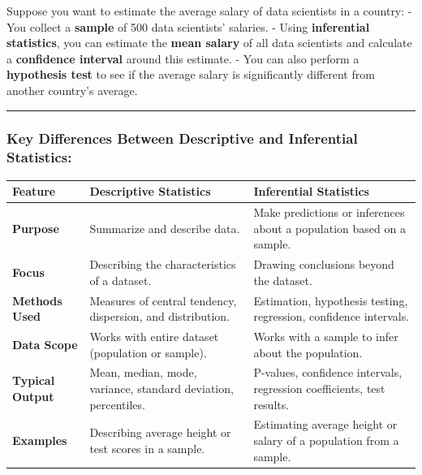 \documentclass[12pt]{book}
\begin{document}
Suppose you want to estimate the average salary of data scientists in a
country: - You collect a \textbf{sample} of 500 data scientists'
salaries. - Using \textbf{inferential statistics}, you can estimate the
\textbf{mean salary} of all data scientists and calculate a
\textbf{confidence interval} around this estimate. - You can also
perform a \textbf{hypothesis test} to see if the average salary is
significantly different from another country's average.

\begin{center}\rule{0.5\linewidth}{0.5pt}\end{center}

\clearpage

\subsubsection{\texorpdfstring{\textbf{Key Differences Between
Descriptive and Inferential
Statistics:}}{Key Differences Between Descriptive and Inferential Statistics:}}\label{key-differences-between-descriptive-and-inferential-statistics}

\begin{longtable}[]{@{}
  >{\raggedright\arraybackslash}p{}
  >{\raggedright\arraybackslash}p{}
  >{\raggedright\arraybackslash}p{}@{}}
\toprule\noalign{}
\begin{minipage}[b]{\linewidth}\raggedright
\textbf{Feature}
\end{minipage} & \begin{minipage}[b]{\linewidth}\raggedright
\textbf{Descriptive Statistics}
\end{minipage} & \begin{minipage}[b]{\linewidth}\raggedright
\textbf{Inferential Statistics}
\end{minipage} \\
\midrule\noalign{}
\endhead
\bottomrule\noalign{}
\endlastfoot
\textbf{Purpose} & Summarize and describe data. & Make predictions or
inferences about a population based on a sample. \\
\textbf{Focus} & Describing the characteristics of a dataset. & Drawing
conclusions beyond the dataset. \\
\textbf{Methods Used} & Measures of central tendency, dispersion, and
distribution. & Estimation, hypothesis testing, regression, confidence
intervals. \\
\textbf{Data Scope} & Works with entire dataset (population or sample).
& Works with a sample to infer about the population. \\
\textbf{Typical Output} & Mean, median, mode, variance, standard
deviation, percentiles. & P-values, confidence intervals, regression
coefficients, test results. \\
\textbf{Examples} & Describing average height or test scores in a
sample. & Estimating average height or salary of a population from a
sample. \\
\end{longtable}
\end{document}
